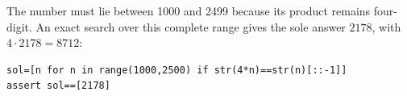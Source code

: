 The number must lie between 1000 and 2499 because its product remains four-digit. An exact search over this complete range gives the sole answer $\boxed{2178}$, with $ 4\cdot2178=8712 $:
\begin{verbatim}
sol=[n for n in range(1000,2500) if str(4*n)==str(n)[::-1]]
assert sol==[2178]
\end{verbatim}
